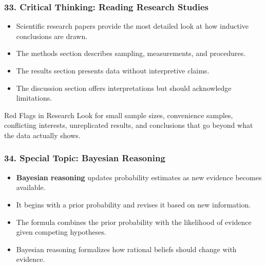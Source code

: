 \documentclass{beamer}
\begin{document}
\begin{frame}
\frametitle{33. Critical Thinking: Reading Research Studies}
\begin{itemize}
    \item Scientific research papers provide the most detailed look at how inductive conclusions are drawn.
    \item The methods section describes sampling, measurements, and procedures.
    \item The results section presents data without interpretive claims.
    \item The discussion section offers interpretations but should acknowledge limitations.
\end{itemize}

\begin{block}{Red Flags in Research}
Look for small sample sizes, convenience samples, conflicting interests, unreplicated results, and conclusions that go beyond what the data actually shows.
\end{block}
\end{frame}

\begin{frame}
\frametitle{34. Special Topic: Bayesian Reasoning}
\begin{itemize}
    \item \textbf{Bayesian reasoning} updates probability estimates as new evidence becomes available.
    \item It begins with a prior probability and revises it based on new information.
    \item The formula combines the prior probability with the likelihood of evidence given competing hypotheses.
    \item Bayesian reasoning formalizes how rational beliefs should change with evidence.
\end{itemize}

\end{frame}
\end{document}
